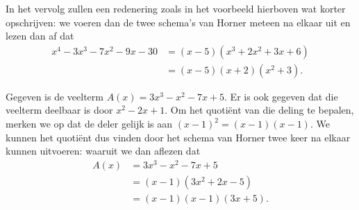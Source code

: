 \documentclass{ximera}
\begin{document}
In het vervolg zullen een redenering zoals in het voorbeeld hierboven wat korter opschrijven: we voeren dan de twee schema's van Horner meteen na elkaar uit
\renewcommand{\kolbreed}{\widthof{$-30$}}
en lezen dan af dat  
\begin{align*}
x^4 - 3x^3 - 7x^2 - 9 x - 30 
& = (x-5)(x^3 + 2x^2 + 3x + 6) \\
& = (x-5)(x+2)(x^2+3).
\end{align*}

\begin{example}
Gegeven is de veelterm $A(x) = 3 x^3 - x^2 - 7 x + 5$. Er is ook gegeven dat die veelterm deelbaar is door $x^2-2x+1$. Om het quoti\"ent van die deling te bepalen, merken we op dat de deler gelijk is aan $(x-1)^2 = (x-1)(x-1)$. We kunnen het quoti\"ent dus vinden door het schema van Horner twee keer na elkaar kunnen uitvoeren:
\renewcommand{\kolbreed}{\widthof{$-30$}}
waaruit we dan aflezen dat 
\begin{align*}
A(x) 
& = 3x^3 - x^2 - 7x + 5 \\
& = (x-1)(3x^2+2x-5) \\
& = (x-1)(x-1)(3x+5).
\end{align*}
\end{example}
\end{document}
